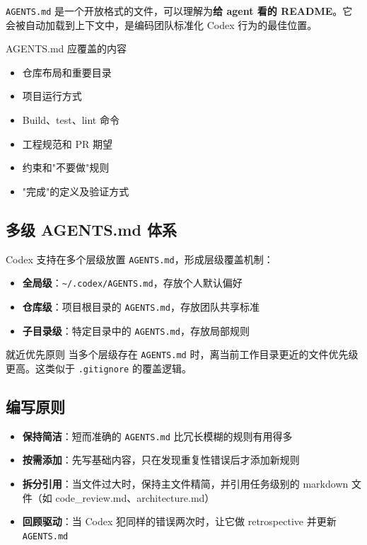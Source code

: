 \documentclass[a4paper]{article}
\begin{document}
\texttt{AGENTS.md} 是一个开放格式的文件，可以理解为\textbf{给 agent 看的 README}。它会被自动加载到上下文中，是编码团队标准化 Codex 行为的最佳位置。

\begin{importantbox}{AGENTS.md 应覆盖的内容}
\begin{itemize}[nosep]
    \item 仓库布局和重要目录
    \item 项目运行方式
    \item Build、test、lint 命令
    \item 工程规范和 PR 期望
    \item 约束和"不要做"规则
    \item "完成"的定义及验证方式
\end{itemize}
\end{importantbox}

\subsection{多级 AGENTS.md 体系}

Codex 支持在多个层级放置 \texttt{AGENTS.md}，形成层级覆盖机制：

\begin{itemize}
    \item \textbf{全局级}：\texttt{\textasciitilde/.codex/AGENTS.md}，存放个人默认偏好
    \item \textbf{仓库级}：项目根目录的 \texttt{AGENTS.md}，存放团队共享标准
    \item \textbf{子目录级}：特定目录中的 \texttt{AGENTS.md}，存放局部规则
\end{itemize}

\begin{knowledgebox}{就近优先原则}
当多个层级存在 \texttt{AGENTS.md} 时，离当前工作目录更近的文件优先级更高。这类似于 \texttt{.gitignore} 的覆盖逻辑。
\end{knowledgebox}

\subsection{编写原则}

\begin{itemize}
    \item \textbf{保持简洁}：短而准确的 \texttt{AGENTS.md} 比冗长模糊的规则有用得多
    \item \textbf{按需添加}：先写基础内容，只在发现重复性错误后才添加新规则
    \item \textbf{拆分引用}：当文件过大时，保持主文件精简，并引用任务级别的 markdown 文件（如 code\_review.md、architecture.md）
    \item \textbf{回顾驱动}：当 Codex 犯同样的错误两次时，让它做 retrospective 并更新 \texttt{AGENTS.md}
\end{itemize}
\end{document}
